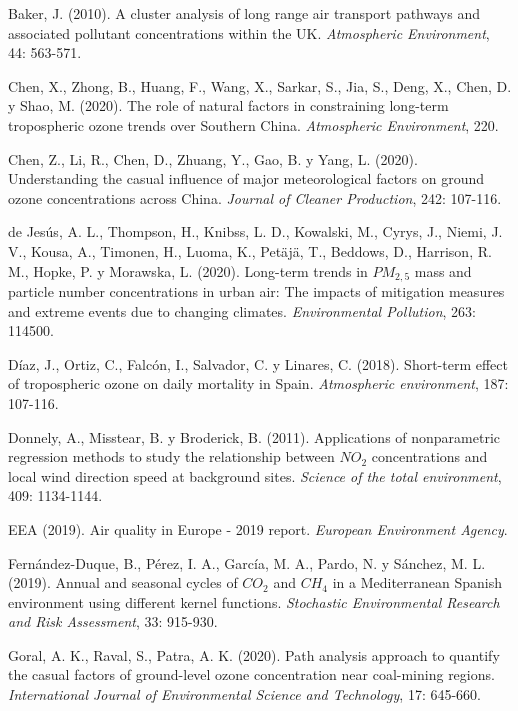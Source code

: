 \documentclass[12pt]{article}
\begin{document}
\begin{thebibliography}{99}

 Baker, J. (2010). A cluster analysis of long range air transport pathways and associated pollutant concentrations within the UK. \textit{Atmospheric Environment}, 44: 563-571.

 Chen, X., Zhong, B., Huang, F., Wang, X., Sarkar, S., Jia, S., Deng, X., Chen, D. y Shao, M. (2020). The role of natural factors in constraining long-term tropospheric ozone trends over Southern China. \textit{Atmospheric Environment}, 220.

 Chen, Z., Li, R., Chen, D., Zhuang, Y., Gao, B. y Yang, L. (2020). Understanding the casual influence of major meteorological factors on ground ozone concentrations across China. \textit{Journal of Cleaner Production}, 242: 107-116.

 de Jesús, A. L., Thompson, H., Knibss, L. D., Kowalski, M., Cyrys, J., Niemi, J. V., Kousa, A., Timonen, H., Luoma, K., Petäjä, T., Beddows, D., Harrison, R. M., Hopke, P. y Morawska, L. (2020). Long-term trends in $PM_{2,5}$ mass and particle number concentrations in urban air: The impacts of mitigation measures and extreme events due to changing climates. \textit{Environmental Pollution}, 263: 114500.

 Díaz, J., Ortiz, C., Falcón, I., Salvador, C. y Linares, C. (2018). Short-term effect of tropospheric ozone on daily mortality in Spain. \textit{Atmospheric environment}, 187: 107-116.

 Donnely, A., Misstear, B. y Broderick, B. (2011). Applications of nonparametric regression methods to study the relationship between $NO_{2}$ concentrations and local wind direction speed at background sites. \textit{Science of the total environment}, 409: 1134-1144.

 EEA (2019). Air quality in Europe - 2019 report. \textit{European Environment Agency}.

 Fernández-Duque, B., Pérez, I. A., García, M. A., Pardo, N. y Sánchez, M. L. (2019). Annual and seasonal cycles of $CO_{2}$ and $CH_{4}$ in a Mediterranean Spanish environment using different kernel functions. \textit{Stochastic Environmental Research and Risk Assessment}, 33: 915-930.

 Goral, A. K., Raval, S., Patra, A. K. (2020). Path analysis approach to quantify the casual factors of ground-level ozone concentration near coal-mining regions. \textit{International Journal of Environmental Science and Technology}, 17: 645-660.


\end{thebibliography}
\end{document}
